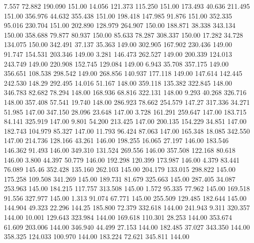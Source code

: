    7.557   72.882  190.090       151.00
  14.056  121.373  115.250       151.00
 173.493   40.636  211.495       151.00
 356.976   44.632  355.438       151.00
 198.418  147.985   91.876       151.00
 352.335   95.016  230.704       151.00
 202.890  128.979  264.907       150.00
 188.871   38.338  343.134       150.00
 358.688   79.877   80.937       150.00
  85.633   78.287  308.337       150.00
  17.282   34.728  134.075       150.00
 342.491   37.137   35.363       149.00
 302.905  167.902  230.436       149.00
  91.747  154.531  203.346       149.00
   3.281  146.473  262.527       149.00
 200.339  124.013  243.749       149.00
 220.908  152.745  129.084       149.00
   6.943   35.708  357.175       149.00
 356.651  108.538  298.542       149.00
 268.856  140.937  177.118       149.00
 147.614  142.445  242.530       148.29
 292.495   14.016   51.167       148.00
 359.118  135.382  322.845       148.00
 346.783   82.682   78.294       148.00
 168.936   68.816  322.131       148.00
   9.293   40.268  326.716       148.00
 357.408   57.541   19.740       148.00
 286.923   78.662  254.579       147.27
 317.336   34.271   51.985       147.00
 347.150   28.096   23.648       147.00
   3.728  161.291  259.647       147.00
 183.715   84.141  325.919       147.00
   9.801   54.200  213.425       147.00
 200.135  154.229   34.851       147.00
 182.743  104.979   85.327       147.00
  11.793   96.424   87.063       147.00
 165.348   18.085  342.550       147.00
 214.736  128.166   43.261       146.00
 198.255   16.065   27.197       146.00
 183.546  146.362   91.493       146.00
 349.310  131.524  269.556       146.00
 357.508  122.168   80.618       146.00
   3.800   44.397   50.779       146.00
 192.298  120.399  173.987       146.00
   4.379   83.441   76.089       145.46
 352.428  135.160  262.103       145.00
 204.179  133.015  298.822       145.00
 175.258  109.508  341.269       145.00
 189.731   81.679  325.663       145.00
 287.405   34.087  253.963       145.00
 184.215  117.757  313.508       145.00
   1.572   95.335   77.962       145.00
 169.518   91.556  327.977       145.00
   1.313   91.074   67.771       145.00
 255.509  129.485  182.644       145.00
 144.904   49.323   22.296       144.25
 185.800   72.379  332.618       144.00
 241.943    9.311  320.357       144.00
  10.001  129.643  323.984       144.00
 169.618  110.301   28.253       144.00
 353.674   61.609  203.006       144.00
 346.940   44.499   27.153       144.00
 182.485   37.027  343.350       144.00
 358.325  124.033  100.970       144.00
 183.224   72.621  345.811       144.00
